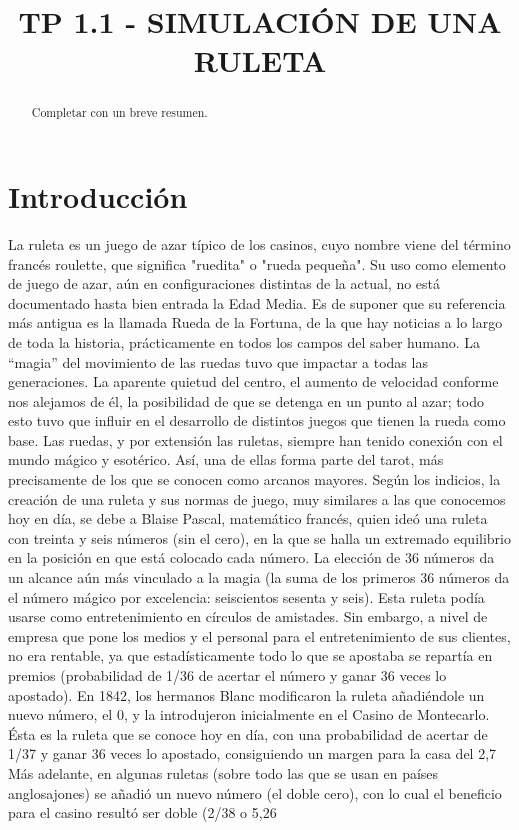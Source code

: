 


\title{TP 1.1 - SIMULACIÓN DE UNA RULETA}


\maketitle
\begin{abstract}
Completar con un breve resumen.
\end{abstract}


\section{Introducción}
La ruleta es un juego de azar típico de los casinos, cuyo nombre viene del término francés roulette, que significa
"ruedita" o "rueda pequeña". Su uso como elemento de juego de azar, aún en configuraciones distintas de la actual, no
está documentado hasta bien entrada la Edad Media. Es de suponer que su referencia más antigua es la llamada Rueda
de la Fortuna, de la que hay noticias a lo largo de toda la historia, prácticamente en todos los campos del saber humano.
La “magia” del movimiento de las ruedas tuvo que impactar a todas las generaciones. La aparente quietud del centro, el
aumento de velocidad conforme nos alejamos de él, la posibilidad de que se detenga en un punto al azar; todo esto tuvo
que influir en el desarrollo de distintos juegos que tienen la rueda como base.
Las ruedas, y por extensión las ruletas, siempre han tenido conexión con el mundo mágico y esotérico. Así, una de ellas
forma parte del tarot, más precisamente de los que se conocen como arcanos mayores.
Según los indicios, la creación de una ruleta y sus normas de juego, muy similares a las que conocemos hoy en día,
se debe a Blaise Pascal, matemático francés, quien ideó una ruleta con treinta y seis números (sin el cero), en la que
se halla un extremado equilibrio en la posición en que está colocado cada número. La elección de 36 números da
un alcance aún más vinculado a la magia (la suma de los primeros 36 números da el número mágico por excelencia:
seiscientos sesenta y seis).
Esta ruleta podía usarse como entretenimiento en círculos de amistades. Sin embargo, a nivel de empresa que pone los
medios y el personal para el entretenimiento de sus clientes, no era rentable, ya que estadísticamente todo lo que se
apostaba se repartía en premios (probabilidad de 1/36 de acertar el número y ganar 36 veces lo apostado).
En 1842, los hermanos Blanc modificaron la ruleta añadiéndole un nuevo número, el 0, y la introdujeron inicialmente
en el Casino de Montecarlo. Ésta es la ruleta que se conoce hoy en día, con una probabilidad de acertar de 1/37 y ganar
36 veces lo apostado, consiguiendo un margen para la casa del 2,7%
Más adelante, en algunas ruletas (sobre todo las que se usan en países anglosajones) se añadió un nuevo número (el
doble cero), con lo cual el beneficio para el casino resultó ser doble (2/38 o 5,26%


